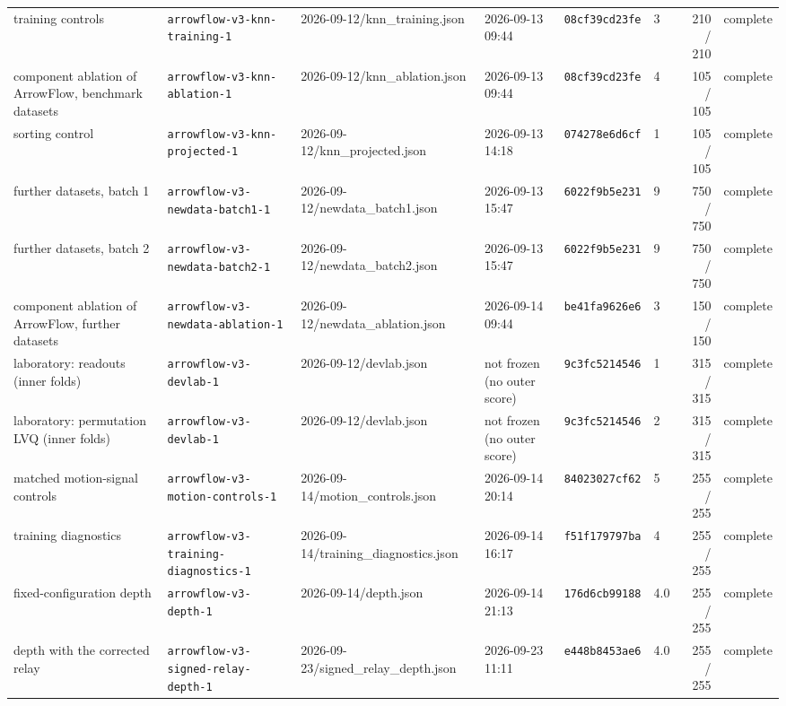 \begin{landscape}
\begin{longtable}{p{125pt}p{120pt}p{120pt}p{65pt}llrl}
training controls & \texttt{arrowflow-\allowbreak v3-knn-training-1} & 2026-09-12/knn\_training.json & 2026-09-13 09:44 & \texttt{08cf39cd23fe} & 3 & 210 / 210 & complete \\
component ablation of ArrowFlow, benchmark datasets & \texttt{arrowflow-\allowbreak v3-knn-ablation-1} & 2026-09-12/knn\_ablation.json & 2026-09-13 09:44 & \texttt{08cf39cd23fe} & 4 & 105 / 105 & complete \\
sorting control & \texttt{arrowflow-\allowbreak v3-knn-projected-1} & 2026-09-12/knn\_projected.json & 2026-09-13 14:18 & \texttt{074278e6d6cf} & 1 & 105 / 105 & complete \\
further datasets, batch 1 & \texttt{arrowflow-\allowbreak v3-newdata-batch1-1} & 2026-09-12/newdata\_batch1.json & 2026-09-13 15:47 & \texttt{6022f9b5e231} & 9 & 750 / 750 & complete \\
further datasets, batch 2 & \texttt{arrowflow-\allowbreak v3-newdata-batch2-1} & 2026-09-12/newdata\_batch2.json & 2026-09-13 15:47 & \texttt{6022f9b5e231} & 9 & 750 / 750 & complete \\
component ablation of ArrowFlow, further datasets & \texttt{arrowflow-\allowbreak v3-newdata-ablation-1} & 2026-09-12/newdata\_ablation.json & 2026-09-14 09:44 & \texttt{be41fa9626e6} & 3 & 150 / 150 & complete \\
laboratory: readouts (inner folds) & \texttt{arrowflow-\allowbreak v3-devlab-1} & 2026-09-12/devlab.json & not frozen (no outer score) & \texttt{9c3fc5214546} & 1 & 315 / 315 & complete \\
laboratory: permutation LVQ (inner folds) & \texttt{arrowflow-\allowbreak v3-devlab-1} & 2026-09-12/devlab.json & not frozen (no outer score) & \texttt{9c3fc5214546} & 2 & 315 / 315 & complete \\
matched motion-signal controls & \texttt{arrowflow-\allowbreak v3-motion-controls-1} & 2026-09-14/motion\_controls.json & 2026-09-14 20:14 & \texttt{84023027cf62} & 5 & 255 / 255 & complete \\
training diagnostics & \texttt{arrowflow-\allowbreak v3-training-diagnostics-1} & 2026-09-14/training\_diagnostics.json & 2026-09-14 16:17 & \texttt{f51f179797ba} & 4 & 255 / 255 & complete \\
fixed-configuration depth & \texttt{arrowflow-\allowbreak v3-depth-1} & 2026-09-14/depth.json & 2026-09-14 21:13 & \texttt{176d6cb99188} & 4.0 & 255 / 255 & complete \\
depth with the corrected relay & \texttt{arrowflow-\allowbreak v3-signed-relay-depth-1} & 2026-09-23/signed\_relay\_depth.json & 2026-09-23 11:11 & \texttt{e448b8453ae6} & 4.0 & 255 / 255 & complete \\

\end{longtable}
\end{landscape}
